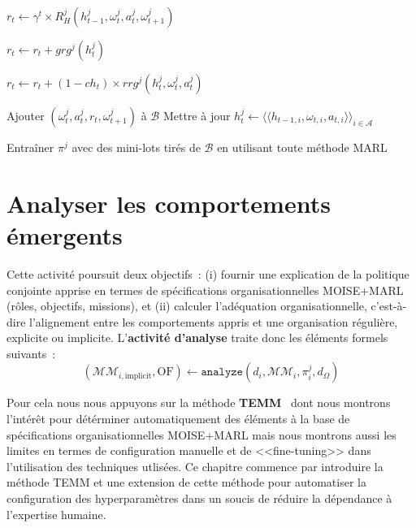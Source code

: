 \begin{algorithm}[H]
{{  $r_t \gets \gamma^t \times R_H^j(h^j_{t-1}, \omega_t^j, a_t^j, \omega_{t+1}^j)$ 

  $r_t \gets r_t + grg^j(h^j_t)$ 

  $r_t \gets r_t + (1 - ch_t) \times rrg^j(h^j_t, \omega_t^j, a_t^j)$ 

  Ajouter $(\omega_t^j, a_t^j, r_t, \omega_{t+1}^j)$ à $\mathcal{B}$ \;
  Mettre à jour $h^j_t \gets \langle \langle h_{t-1,i}, \omega_{t,i}, a_{t,i} \rangle \rangle_{i \in \mathcal{A}}$ \;

  Entraîner $\pi^j$ avec des mini-lots tirés de $\mathcal{B}$ en utilisant toute méthode MARL \;
  }
  }

\end{algorithm}



\clearpage
\thispagestyle{empty}
\null
\newpage

\chapter{Analyser les comportements émergents}
\label{chap:analyzing}


Cette activité poursuit deux objectifs~: (i) fournir une explication de la politique conjointe apprise en termes de spécifications organisationnelles MOISE+MARL (rôles, objectifs, missions), et (ii) calculer l'adéquation organisationnelle, c'est-à-dire l'alignement entre les comportements appris et une organisation régulière, explicite ou implicite.
L'\textbf{activité d'analyse} traite donc les éléments formels suivants~:
\[
  (\mathcal{MM}_{i,\text{implicit}}, \text{OF}) \gets \texttt{analyze}(d_i, \mathcal{MM}_i, \pi^j_i, d_\Omega)
\]

\noindent
Pour cela nous nous appuyons sur la méthode \textbf{TEMM}~\cite{soule2025moisemarl} dont nous montrons l’intérêt pour détérminer automatiquement des éléments à la base de spécifications organisationnelles MOISE+MARL mais nous montrons aussi les limites en termes de configuration manuelle et de <<fine-tuning>> dans l'utilisation des techniques  utlisées. Ce chapitre commence par introduire la méthode TEMM et une extension de cette méthode pour automatiser la configuration des hyperparamètres dans un soucis de réduire la dépendance à l'expertise humaine.

